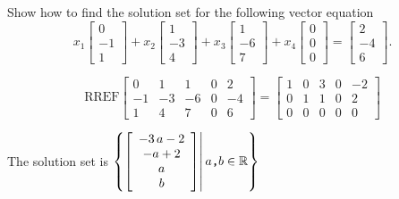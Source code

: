 
\begin{exerciseStatement}


Show how to find the solution set for the following vector equation \[ x_{1} \left[\begin{array}{c}
0 \\
-1 \\
1
\end{array}\right] + x_{2} \left[\begin{array}{c}
1 \\
-3 \\
4
\end{array}\right] + x_{3} \left[\begin{array}{c}
1 \\
-6 \\
7
\end{array}\right] + x_{4} \left[\begin{array}{c}
0 \\
0 \\
0
\end{array}\right] = \left[\begin{array}{c}
2 \\
-4 \\
6
\end{array}\right] .\]


\end{exerciseStatement}
    
\begin{exerciseAnswer} 
\[\mathrm{RREF} \left[\begin{array}{cccc|c}
0 & 1 & 1 & 0 & 2 \\
-1 & -3 & -6 & 0 & -4 \\
1 & 4 & 7 & 0 & 6
\end{array}\right]  =  \left[\begin{array}{cccc|c}
1 & 0 & 3 & 0 & -2 \\
0 & 1 & 1 & 0 & 2 \\
0 & 0 & 0 & 0 & 0
\end{array}\right] \]

The solution set is \( \left\{ \left[\begin{array}{c}
-3 \, a - 2 \\
-a + 2 \\
a \\
b
\end{array}\right] \middle|\,a\text{\texttt{,}}b\in\mathbb{R}\right\} \)


\end{exerciseAnswer}
    
